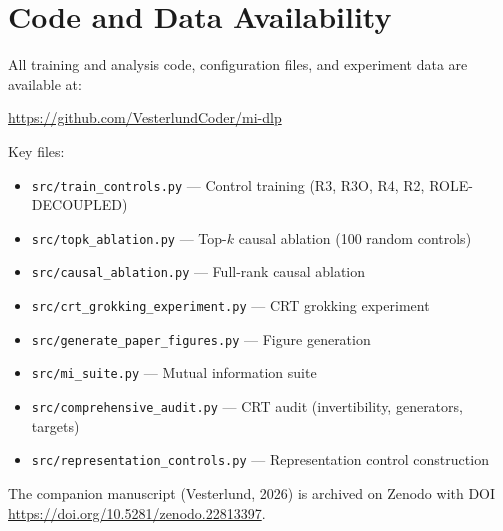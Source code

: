 \documentclass[11pt,a4paper]{article}
\begin{document}
\section{Code and Data Availability}

All training and analysis code, configuration files, and experiment data are available at:
\begin{center}
\url{https://github.com/VesterlundCoder/mi-dlp}
\end{center}

Key files:
\begin{itemize}
\item \texttt{src/train\_controls.py} --- Control training (R3, R3O, R4, R2, ROLE-DECOUPLED)
\item \texttt{src/topk\_ablation.py} --- Top-$k$ causal ablation (100 random controls)
\item \texttt{src/causal\_ablation.py} --- Full-rank causal ablation
\item \texttt{src/crt\_grokking\_experiment.py} --- CRT grokking experiment
\item \texttt{src/generate\_paper\_figures.py} --- Figure generation
\item \texttt{src/mi\_suite.py} --- Mutual information suite
\item \texttt{src/comprehensive\_audit.py} --- CRT audit (invertibility, generators, targets)
\item \texttt{src/representation\_controls.py} --- Representation control construction
\end{itemize}

The companion manuscript (Vesterlund, 2026) is archived on Zenodo with DOI \url{https://doi.org/10.5281/zenodo.22813397}.
\end{document}
